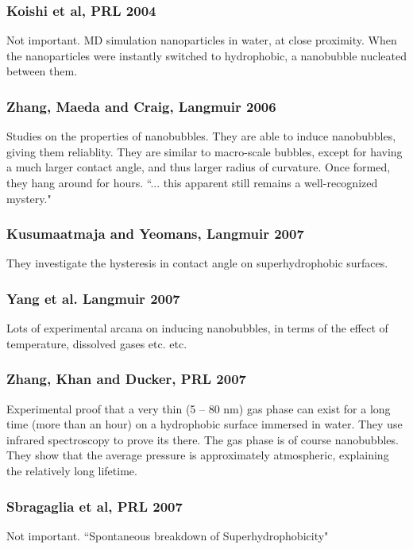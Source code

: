 \documentclass{article}
\begin{document}
\subsubsection*{Koishi et al, PRL 2004}
Not important.  MD simulation nanoparticles in water, at close proximity.  When the nanoparticles were instantly switched to hydrophobic, a nanobubble nucleated between them.


\subsubsection*{Zhang, Maeda and Craig, Langmuir 2006}
Studies on the properties of nanobubbles.  They are able to induce nanobubbles, giving them reliablity.  They are similar to macro-scale bubbles, except for having a much larger contact angle, and thus larger radius of curvature.  Once formed, they hang around for hours.  ``... this apparent still remains a well-recognized mystery."

\subsubsection*{Kusumaatmaja and Yeomans, Langmuir 2007}
They investigate the hysteresis in contact angle on superhydrophobic surfaces.


\subsubsection*{Yang et al. Langmuir 2007}
Lots of experimental arcana on inducing nanobubbles, in terms of the effect of temperature, dissolved gases etc. etc.

\subsubsection*{Zhang, Khan and Ducker, PRL 2007}
Experimental proof that a very thin (5 -- 80 nm) gas phase can exist for a long time (more than an hour) on a hydrophobic surface immersed in water.  They use infrared spectroscopy to prove its there.  The gas phase is of course nanobubbles.  They show that the average pressure is approximately atmospheric, explaining the relatively long lifetime.

\subsubsection*{Sbragaglia et al, PRL 2007}
Not important.  ``Spontaneous breakdown of Superhydrophobicity"
\end{document}
